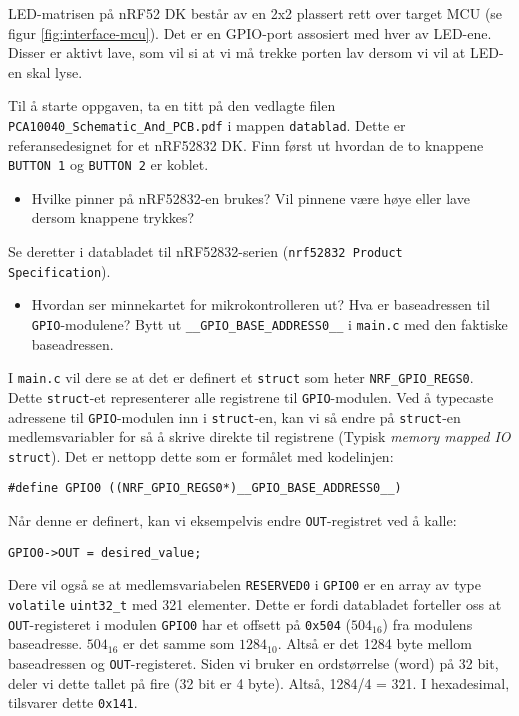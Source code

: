 LED-matrisen på nRF52 DK består av en 2x2 plassert rett over target MCU (se figur \ref{fig:interface-mcu}). Det er en GPIO-port assosiert med hver av LED-ene. Disser er aktivt lave, som vil si at vi må trekke porten lav dersom vi vil at LED-en skal lyse.

Til å starte oppgaven, ta en titt på den vedlagte filen \verb|PCA10040_Schematic_And_PCB.pdf| i mappen \verb|datablad|. Dette er referansedesignet for et nRF52832 DK. Finn først ut hvordan de to knappene \verb|BUTTON 1| og \verb|BUTTON 2| er koblet. 

\begin{itemize}
    \item Hvilke pinner på nRF52832-en brukes? Vil pinnene være høye eller lave dersom knappene trykkes?
\end{itemize}


Se deretter i databladet til nRF52832-serien (\texttt{nrf52832 Product Specification}). 

\begin{itemize}
    \item Hvordan ser minnekartet for mikrokontrolleren ut? Hva er baseadressen til \verb|GPIO|-modulene? Bytt ut \verb|__GPIO_BASE_ADDRESS0__| i \verb|main.c| med den faktiske baseadressen. 
\end{itemize}

I \verb|main.c| vil dere se at det er definert et \verb|struct| som heter \verb|NRF_GPIO_REGS0|. Dette \verb|struct|-et representerer alle registrene til \verb|GPIO|-modulen. Ved å typecaste adressene til \verb|GPIO|-modulen inn i \verb|struct|-en, kan vi så endre på \verb|struct|-en medlemsvariabler for så å skrive direkte til registrene (Typisk \textit{memory mapped IO} \verb|struct|). Det er nettopp dette som er formålet med kodelinjen:

\verb|#define GPIO0 ((NRF_GPIO_REGS0*)__GPIO_BASE_ADDRESS0__)|

Når denne er definert, kan vi eksempelvis endre \verb|OUT|-registret ved å kalle:

\verb|GPIO0->OUT = desired_value;|\newline

 Dere vil også se at medlemsvariabelen \verb|RESERVED0| i \verb|GPIO0| er en array av type \verb|volatile| \verb|uint32_t| med 321 elementer. Dette er fordi databladet forteller oss at \verb|OUT|-registeret i modulen \verb|GPIO0| har et offsett på 
 \verb|0x504| ($\text{504}_{\text{16}}$) fra modulens baseadresse. $\text{504}_{\text{16}}$ er det samme som $\text{1284}_{\text{10}}$. Altså er det 1284 byte mellom baseadressen og \verb|OUT|-registeret. Siden vi bruker en ordstørrelse (word) på 32 bit, deler vi dette tallet på fire (32 bit er 4 byte). Altså, 1284/4 = 321. I hexadesimal, tilsvarer dette \verb|0x141|.
 
